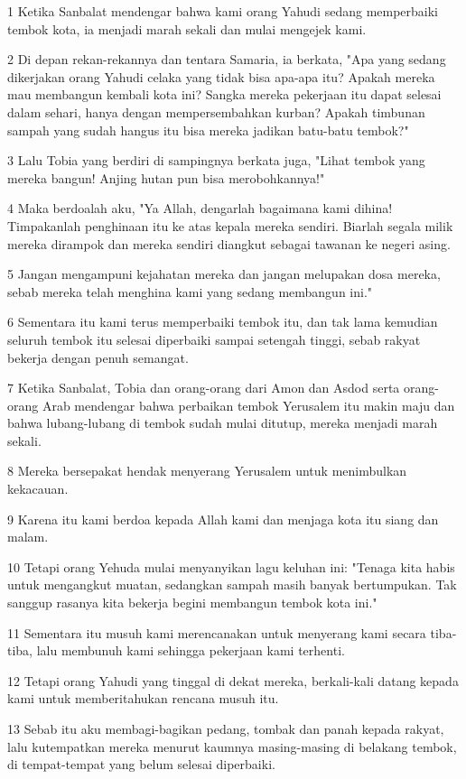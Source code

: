 \par 1 Ketika Sanbalat mendengar bahwa kami orang Yahudi sedang memperbaiki tembok kota, ia menjadi marah sekali dan mulai mengejek kami.
\par 2 Di depan rekan-rekannya dan tentara Samaria, ia berkata, "Apa yang sedang dikerjakan orang Yahudi celaka yang tidak bisa apa-apa itu? Apakah mereka mau membangun kembali kota ini? Sangka mereka pekerjaan itu dapat selesai dalam sehari, hanya dengan mempersembahkan kurban? Apakah timbunan sampah yang sudah hangus itu bisa mereka jadikan batu-batu tembok?"
\par 3 Lalu Tobia yang berdiri di sampingnya berkata juga, "Lihat tembok yang mereka bangun! Anjing hutan pun bisa merobohkannya!"
\par 4 Maka berdoalah aku, "Ya Allah, dengarlah bagaimana kami dihina! Timpakanlah penghinaan itu ke atas kepala mereka sendiri. Biarlah segala milik mereka dirampok dan mereka sendiri diangkut sebagai tawanan ke negeri asing.
\par 5 Jangan mengampuni kejahatan mereka dan jangan melupakan dosa mereka, sebab mereka telah menghina kami yang sedang membangun ini."
\par 6 Sementara itu kami terus memperbaiki tembok itu, dan tak lama kemudian seluruh tembok itu selesai diperbaiki sampai setengah tinggi, sebab rakyat bekerja dengan penuh semangat.
\par 7 Ketika Sanbalat, Tobia dan orang-orang dari Amon dan Asdod serta orang-orang Arab mendengar bahwa perbaikan tembok Yerusalem itu makin maju dan bahwa lubang-lubang di tembok sudah mulai ditutup, mereka menjadi marah sekali.
\par 8 Mereka bersepakat hendak menyerang Yerusalem untuk menimbulkan kekacauan.
\par 9 Karena itu kami berdoa kepada Allah kami dan menjaga kota itu siang dan malam.
\par 10 Tetapi orang Yehuda mulai menyanyikan lagu keluhan ini: "Tenaga kita habis untuk mengangkut muatan, sedangkan sampah masih banyak bertumpukan. Tak sanggup rasanya kita bekerja begini membangun tembok kota ini."
\par 11 Sementara itu musuh kami merencanakan untuk menyerang kami secara tiba-tiba, lalu membunuh kami sehingga pekerjaan kami terhenti.
\par 12 Tetapi orang Yahudi yang tinggal di dekat mereka, berkali-kali datang kepada kami untuk memberitahukan rencana musuh itu.
\par 13 Sebab itu aku membagi-bagikan pedang, tombak dan panah kepada rakyat, lalu kutempatkan mereka menurut kaumnya masing-masing di belakang tembok, di tempat-tempat yang belum selesai diperbaiki.

